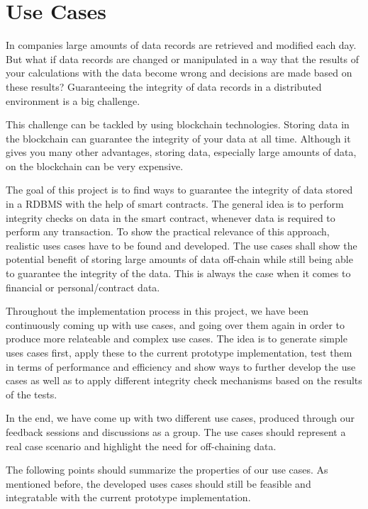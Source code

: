 \chapter{Use Cases} \label{sssec:use_cases}

In companies large amounts of data records are retrieved and modified each day. But what if data records are changed or manipulated in a way that the results of your calculations with the data become wrong and decisions are made based on these results? Guaranteeing the integrity of data records in a distributed environment is a big challenge.

This challenge can be tackled by using blockchain technologies. Storing data in the blockchain can guarantee the integrity of your data at all time. Although it gives you many other advantages, storing data, especially large amounts of data, on the blockchain can be very expensive.

The goal of this project is to find ways to guarantee the integrity of data stored in a RDBMS with the help of smart contracts. The general idea is to perform integrity checks on data in the smart contract, whenever data is required to perform any transaction. To show the practical relevance of this approach, realistic uses cases have to be found and developed. The use cases shall show the potential benefit of storing large amounts of data off-chain while still being able to guarantee the integrity of the data. This is always the case when it comes to financial or personal/contract data.

Throughout the implementation process in this project, we have been continuously coming up with use cases, and going over them again in order to produce more relateable and complex use cases. The idea is to generate simple uses cases first, apply these to the current prototype implementation, test them in terms of performance and efficiency and show ways to further develop the use cases as well as to apply different integrity check mechanisms based on the results of the tests.

In the end, we have come up with two different use cases, produced through our feedback sessions and discussions as a group. The use cases should represent a real case scenario and highlight the need for off-chaining data.

The following points should summarize the properties of our use cases. As mentioned before, the developed uses cases should still be feasible and integratable with the current prototype implementation. 

